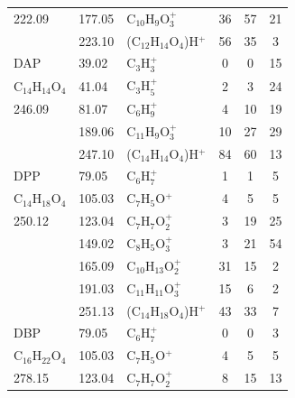 {{\begin{longtable}[c]{lllccc}
222.09          & 177.05               & C$_{10}$H$_9$O$_3^+$     & 36           & 57           & 21           \\
          & 223.10                & (C$_{12}$H$_{14}$O$_4$)H$^+$ & 56           & 35           & 3            \\
\hline
DAP                                                      & 39.02  & C$_3$H$_3^+$                        & 0  & 0  & 15 \\
C$_{14}$H$_{14}$O$_4$ & 41.04  & C$_3$H$_5^+$                        & 2  & 3  & 24 \\
246.09                                                   & 81.07  & C$_6$H$_9^+$                        & 4  & 10 & 19 \\
                                                         & 189.06 & C$_{11}$H$_9$O$_3^+$     & 10 & 27 & 29 \\
                                                         & 247.10  & (C$_{14}$H$_{14}$O$_4$)H$^+$ & 84 & 60 & 13\\
\hline
DPP       & 79.05                & C$_6$H$_7^+$                           & 1            & 1            & 5            \\
C$_{14}$H$_{18}$O$_4$          & 105.03               & C$_7$H$_5$O$^+$                          & 4            & 5            & 5            \\
250.12          & 123.04               & C$_7$H$_7$O$_2^+$      & 3            & 19           & 25           \\
          & 149.02               & C$_8$H$_5$O$_3^+$      & 3            & 21           & 54           \\
          & 165.09               & C$_{10}$H$_{13}$O$_2^+$    & 31           & 15           & 2            \\
          & 191.03               & C$_{11}$H$_{11}$O$_3^+$    & 15           & 6            & 2            \\
          & 251.13               & (C$_{14}$H$_{18}$O$_4$)H$^+$ & 43           & 33           & 7            \\
\hline
DBP                                                      & 79.05  & C$_6$H$_7^+$                        & 0  & 0  & 3  \\
C$_{16}$H$_{22}$O$_4$ & 105.03 & C$_7$H$_5$O$^+$                       & 4  & 5  & 5  \\
278.15                                                   & 123.04 & C$_7$H$_7$O$_2^+$      & 8  & 15 & 13 \\

\end{longtable}}}
